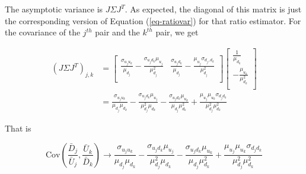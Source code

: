 \documentclass{article}
\newcommand{\Cov}{\mbox{Cov}}
\theoremstyle{definition}
\begin{document}
The asymptotic variance is $J\Sigma J^T$. As expected, the diagonal of this matrix is just the corresponding version of Equation (\ref{eq-ratiovar}) for that ratio estimator. For the covariance of the $j^{th}$ pair and the $k^{th}$ pair, we get

\begin{align*}
(J\Sigma J^T)_{j,k} &= 
    \begin{bmatrix}
  \frac{\sigma_{u_ju_k}}{\mu_{d_j}} - \frac{\sigma_{u_jd_k}\mu_{u_j}}{\mu_{d_j}^2}  & \frac{\sigma_{u_jd_k}}{\mu_{d_j}} - \frac{\mu_{u_j}\sigma_{d_j,d_k}}{\mu_{d_j}^2} \\
\end{bmatrix} \begin{bmatrix}
   \frac{1}{\mu_{d_k}} \\ 
    -\frac{\mu_{u_k}}{\mu_{d_k}^2} \\ 
\end{bmatrix}\\ 
&= \frac{\sigma_{u_ju_k}}{\mu_{d_j}\mu_{d_k}} - \frac{\sigma_{u_jd_k}\mu_{u_j}}{\mu^2_{d_j}\mu_{d_k}} - \frac{\sigma_{u_jd_k}\mu_{u_k}}{\mu_{d_j}\mu_{d_k}^2}  + \frac{\mu_{u_j}\mu_{u_k}\sigma_{d_jd_k}}{\mu_{d_j}^2\mu_{d_k}^2}
\end{align*}

That is 

\begin{equation*}
    \Cov\left(\frac{\bar{D}_j}{\bar{U}_j}, \frac{\bar{U}_k}{\bar{D}_k}\right) \rightarrow \frac{\sigma_{u_ju_k}}{\mu_{d_j}\mu_{d_k}} - \frac{\sigma_{u_jd_k}\mu_{u_j}}{\mu^2_{d_j}\mu_{d_k}} - \frac{\sigma_{u_jd_k}\mu_{u_k}}{\mu_{d_j}\mu_{d_k}^2}  + \frac{\mu_{u_j}\mu_{u_k}\sigma_{d_jd_k}}{\mu_{d_j}^2\mu_{d_k}^2}
\end{equation*}
\end{document}
